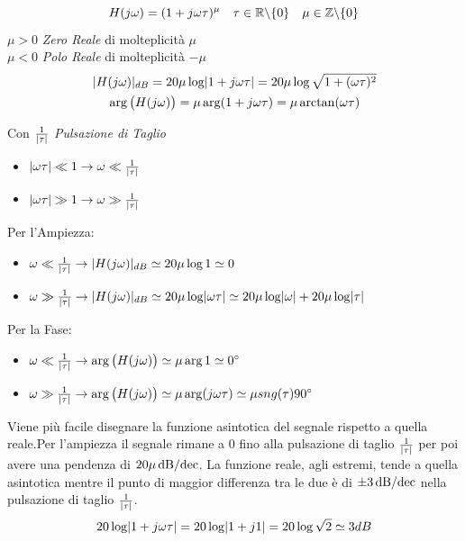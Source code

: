 \[ H(j\omega) = (1+j\omega\tau)^{\mu} \quad \tau \in \R \backslash \{0\} \quad \mu \in \Z \backslash \{0\}  \]
$ \mu>0 $ \emph{Zero Reale} di molteplicità $ \mu $\\
$ \mu<0 $ \emph{Polo Reale} di molteplicità $ -\mu $
\begin{gather*}
	\abs{H(j\omega)}_{dB} = 20 \mu \log \abs{1+j\omega\tau} = 20 \mu \log \sqrt{1+(\omega\tau)^2} \\
	\arg \big(H(j\omega)\big) = \mu \arg(1+j\omega\tau) = \mu \arctan(\omega\tau)
\end{gather*}

Con $ \frac{1}{\abs{\tau}} $ \emph{Pulsazione di Taglio}
\begin{itemize}
	\item $ \abs{\omega\tau} \ll 1 \rightarrow \omega \ll \frac{1}{\abs{\tau}}$
	\item $ \abs{\omega\tau} \gg 1 \rightarrow \omega \gg \frac{1}{\abs{\tau}}$
\end{itemize}

Per l'Ampiezza:
\begin{itemize}
	\item $ \omega \ll \frac{1}{\abs{\tau}} \rightarrow \abs{H(j\omega)}_{dB} \simeq 20\mu \log 1 \simeq 0 $
	\item $ \omega \gg \frac{1}{\abs{\tau}} \rightarrow \abs{H(j\omega)}_{dB} \simeq 20\mu \log \abs{\omega\tau} \simeq 20 \mu \log \abs{\omega} +20 \mu \log \abs{\tau} $
\end{itemize}

Per la Fase:
\begin{itemize}
	\item $ \omega \ll \frac{1}{\abs{\tau}} \rightarrow \arg \big(H(j\omega)\big) \simeq \mu \arg 1 \simeq \ang{0} $ 
	\item $ \omega \gg \frac{1}{\abs{\tau}} \rightarrow \arg \big(H(j\omega)\big) \simeq \mu \arg (j\omega\tau) \simeq \mu sng(\tau)\ang{90} $ 
\end{itemize}

Viene più facile disegnare la funzione asintotica del segnale rispetto a quella reale.Per l'ampiezza il segnale rimane a $ 0 $ fino alla pulsazione di taglio $ \frac{1}{\abs{\tau}} $ per poi avere una pendenza di $ 20 \mu \dbdec $. La funzione reale, agli estremi, tende a quella asintotica mentre il punto di maggior differenza tra le due è di $ \pm 3 \dbdec $ nella pulsazione di taglio $ \frac{1}{\abs{\tau}} $.
\[ 20\log \abs{1+j\omega\tau} = 20\log \abs{1+j1} = 20\log \sqrt{2} \simeq 3 dB \] 

